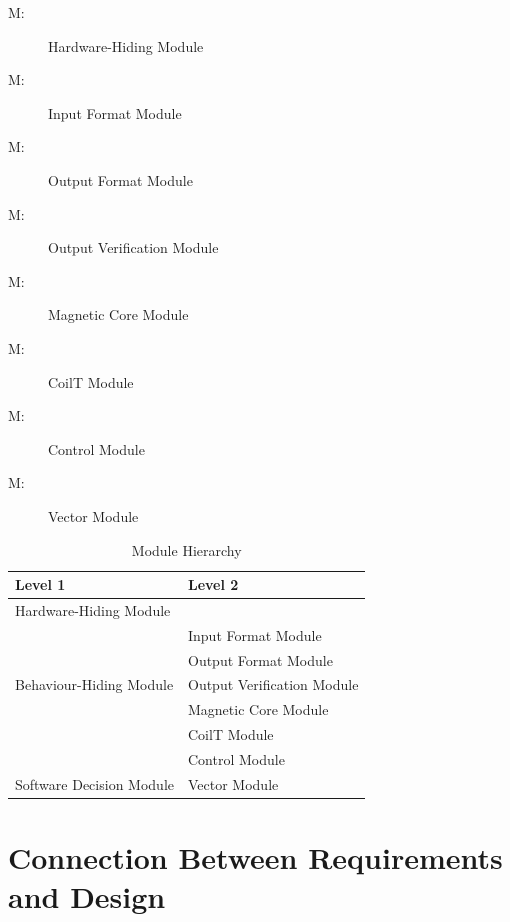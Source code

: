 \documentclass[12pt, titlepage]{article}
\newcounter{mnum}
\newcommand{\mthemnum}{M\themnum}
\begin{document}
\begin{description}
\item [ \mthemnum \label{mHH}:] Hardware-Hiding Module
\item [ \mthemnum \label{mIFM}:] Input Format Module
\item [ \mthemnum \label{mOFM}:] Output Format Module
\item [ \mthemnum \label{mOVM}:] Output Verification Module
\item [ \mthemnum \label{mMCM}:] Magnetic Core Module
\item [ \mthemnum \label{mCTM}:] CoilT Module
\item [ \mthemnum \label{mCM}:] Control Module
\item [ \mthemnum \label{mVM}:] Vector Module

\end{description}


\begin{table}[h!]
\centering
\begin{tabular}{p{} p{}}
\toprule
\textbf{Level 1} & \textbf{Level 2}\\
\midrule

{Hardware-Hiding Module} & ~ \\
\midrule

\multirow{5}{0.3\textwidth}{Behaviour-Hiding Module} & Input Format Module\\
& Output Format Module\\
& Output Verification Module\\
& Magnetic Core Module\\
& CoilT Module\\
& Control Module\\
\midrule

\multirow{1}{0.3\textwidth}{Software Decision Module} & Vector Module\\

\bottomrule

\end{tabular}
\caption{Module Hierarchy}
\label{TblMH}
\end{table}

\section{Connection Between Requirements and Design} \label{SecConnection}
\end{document}
